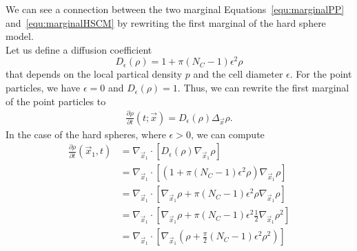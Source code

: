 We can see a connection between the two marginal Equations~\eqref{equ:marginalPP} and~\eqref{equ:marginalHSCM} by rewriting the first marginal of the hard sphere model. \\
Let us define a diffusion coefficient 
\[
    D_{\epsilon}(\rho) = 1 + \pi(N_{C}-1)\epsilon^2 \rho 
\]
that depends on the local partical density $p$ and the cell diameter $\epsilon$. 
For the point particles, we have $\epsilon = 0$ and $D_{\epsilon}(\rho) = 1$.
Thus, we can rewrite the first marginal of the point particles to  
\begin{align*}
    \frac{\partial \rho}{\partial t}(t; \vec{x}) = D_{\epsilon}(\rho) \Delta_{\vec{x}} \rho. 
\end{align*}
In the case of the hard spheres, where $\epsilon > 0$, we can compute
\begin{align*}
    \frac{\partial \rho}{\partial t}(\vec{x}_1, t) &= \nabla_{\vec{x}_1} \cdot [D_{\epsilon}(\rho) \nabla_{\vec{x}_1} \rho] \\  
    &= \nabla_{\vec{x}_1} \cdot [(1 + \pi(N_{C}-1)\epsilon^2 \rho) \nabla_{\vec{x}_1} \rho] \\
    &= \nabla_{\vec{x}_1} \cdot [\nabla_{\vec{x}_1} \rho + \pi(N_{C}-1)\epsilon^2 \rho \nabla_{\vec{x}_1} \rho] \\
    &= \nabla_{\vec{x}_1} \cdot [\nabla_{\vec{x}_1} \rho + \pi(N_{C}-1)\epsilon^2 \frac{1}{2}\nabla_{\vec{x}_1} \rho^2] \\
    &= \nabla_{\vec{x}_1} \cdot [\nabla_{\vec{x}_1} (\rho + \frac{\pi}{2}(N_{C}-1)\epsilon^2 \rho^2)] \\
\end{align*}

